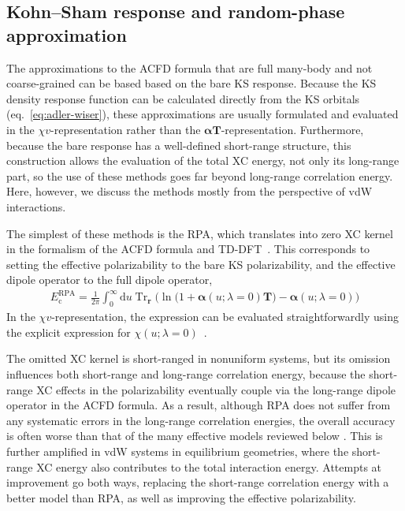 \subsection{Kohn--Sham response and random-phase approximation}\label{sec:rpa}

The approximations to the ACFD formula that are full many-body and not coarse-grained can be based based on the bare KS response.
Because the KS density response function can be calculated directly from the KS orbitals (eq.\ \ref{eq:adler-wiser}), these approximations are usually formulated and evaluated in the $\chi v$-representation rather than the $\boldsymbol\alpha\mathbf T$-representation.
Furthermore, because the bare response has a well-defined short-range structure, this construction allows the evaluation of the total XC energy, not only its long-range part, so the use of these methods goes far beyond long-range correlation energy.
Here, however, we discuss the methods mostly from the perspective of vdW interactions.

The simplest of these methods is the RPA, which translates into zero XC kernel in the formalism of the ACFD formula and TD-DFT~\cite{RenJMS12}.
This corresponds to setting the effective polarizability to the bare KS polarizability, and the effective dipole operator to the full dipole operator,
\begin{equation}
\begin{aligned}
  E_\text{c}^\text{RPA}=\frac1{2\pi}\int_0^\infty\mathrm du\operatorname{Tr}_{\mathbf r}\Big(\ln\big(1+\boldsymbol\alpha(u;\lambda=0)\mathbf T\big)-\boldsymbol\alpha(u;\lambda=0)\Big)
\end{aligned}
\end{equation}
In the $\chi v$-representation, the expression can be evaluated straightforwardly using the explicit expression for $\chi(u;\lambda=0)$~\cite{FurchePRB01}.

The omitted XC kernel is short-ranged in nonuniform systems, but its omission influences both short-range and long-range correlation energy, because the short-range XC effects in the polarizability eventually couple via the long-range dipole operator in the ACFD formula.
As a result, although RPA does not suffer from any systematic errors in the long-range correlation energies, the overall accuracy is often worse than that of the many effective models reviewed below \citep{OlsenPRB13a}.
This is further amplified in vdW systems in equilibrium geometries, where the short-range XC energy also contributes to the total interaction energy.
Attempts at improvement go both ways, replacing the short-range correlation energy with a better model than RPA, as well as improving the effective polarizability.

